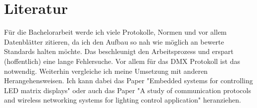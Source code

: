 \section{Literatur}
Für die Bachelorarbeit werde ich viele Protokolle, Normen und vor allem Datenblätter zitieren, da ich den Aufbau so nah wie möglich an bewerte Standards halten möchte. Das beschleunigt den Arbeitsprozess und erspart (hoffentlich) eine lange Fehlersuche. Vor allem für das DMX Protokoll ist das notwendig. Weiterhin vergleiche ich meine Umsetzung mit anderen Herangehensweisen. Ich kann dabei das Paper "Embedded systems for controlling LED matrix displays"\citep{embedded_LED_Matrix} oder auch das Paper "A study of communication protocols and wireless networking systems for lighting control application"\citep{communication_protocols} heranziehen.